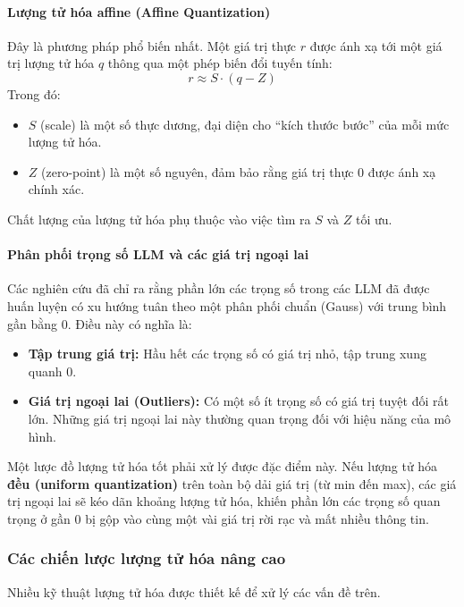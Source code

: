 \paragraph{Lượng tử hóa affine (Affine Quantization)}
Đây là phương pháp phổ biến nhất. Một giá trị thực $r$ được ánh xạ tới một giá trị lượng tử hóa $q$ thông qua một phép biến đổi tuyến tính:
\[ r \approx S \cdot (q - Z) \]
Trong đó:
\begin{itemize}
	\item $S$ (scale) là một số thực dương, đại diện cho “kích thước bước” của mỗi mức lượng tử hóa.
	\item $Z$ (zero-point) là một số nguyên, đảm bảo rằng giá trị thực 0 được ánh xạ chính xác.
\end{itemize}
Chất lượng của lượng tử hóa phụ thuộc vào việc tìm ra $S$ và $Z$ tối ưu.

\paragraph{Phân phối trọng số LLM và các giá trị ngoại lai}
Các nghiên cứu đã chỉ ra rằng phần lớn các trọng số trong các LLM đã được huấn luyện có xu hướng tuân theo một phân phối chuẩn (Gauss) với trung bình gần bằng 0. Điều này có nghĩa là:
\begin{itemize}
	\item \textbf{Tập trung giá trị:} Hầu hết các trọng số có giá trị nhỏ, tập trung xung quanh 0.
	\item \textbf{Giá trị ngoại lai (Outliers):} Có một số ít trọng số có giá trị tuyệt đối rất lớn. Những giá trị ngoại lai này thường quan trọng đối với hiệu năng của mô hình.
\end{itemize}
Một lược đồ lượng tử hóa tốt phải xử lý được đặc điểm này. Nếu lượng tử hóa \textbf{đều (uniform quantization)} trên toàn bộ dải giá trị (từ min đến max), các giá trị ngoại lai sẽ kéo dãn khoảng lượng tử hóa, khiến phần lớn các trọng số quan trọng ở gần 0 bị gộp vào cùng một vài giá trị rời rạc và mất nhiều thông tin.

\subsubsection{Các chiến lược lượng tử hóa nâng cao}
Nhiều kỹ thuật lượng tử hóa được thiết kế để xử lý các vấn đề trên.

